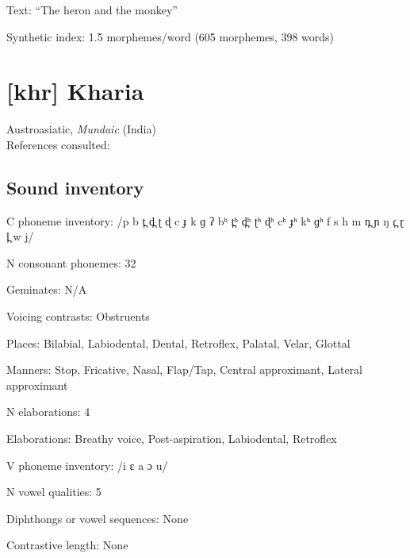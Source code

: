 {\begin{appendixdesc}
\item[Text:] “The heron and the monkey” \citep[516--520]{Donohue1999}

\item[Synthetic index:] 1.5 morphemes/word (605 morphemes, 398 words)
\end{appendixdesc}
\section*{[khr] Kharia}   %
Austroasiatic, \textit{Mundaic} (India)\medskip\\
References consulted: \citet{Peterson2011}

\subsection*{Sound inventory}
\begin{appendixdesc}

\item[C phoneme inventory:] /p b t̪ d̪ ʈ ɖ c ɟ k ɡ ʔ bʰ t̪ʰ d̪ʰ ʈʰ ɖʰ cʰ ɟʰ kʰ ɡʰ f s h m n̪ ɲ ŋ ɾ̪ ɽ l̪ w j/

\item[N consonant phonemes:] 32

\item[Geminates:] N/A

\item[Voicing contrasts:] Obstruents

\item[Places:] Bilabial, Labiodental, Dental, Retroflex, Palatal, Velar, Glottal

\item[Manners:] Stop, Fricative, Nasal, Flap/Tap, Central approximant, Lateral approximant

\item[N elaborations:] 4

\item[Elaborations:] Breathy voice, Post-aspiration, Labiodental, Retroflex

\item[V phoneme inventory:] /i ɛ a ɔ u/

\item[N vowel qualities:] 5

\item[Diphthongs or vowel sequences:] None

\item[Contrastive length:] None


\end{appendixdesc}}
